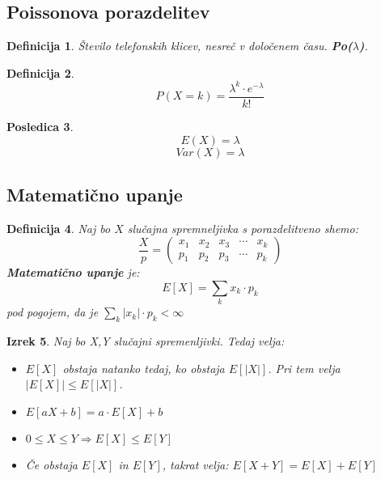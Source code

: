 \documentclass[11pt]{article}
\newtheorem{Izrek}{{\sc Izrek}}[section]
\newtheorem{Posledica}[Izrek]{{\sc Posledica}}
\newtheorem{Definicija}[Izrek]{{\sc Definicija}}
\begin{document}
\subsection{Poissonova porazdelitev}
\begin{Definicija}
	Število telefonskih klicev, nesreč v določenem času. \textbf{Po($\lambda$)}.
\end{Definicija}
\begin{Definicija}
	$$P(X=k) = \frac{\lambda^k \cdot e^{-\lambda}}{k!}$$
\end{Definicija}
\begin{Posledica}
	$$E(X) = \lambda$$
	$$Var(X) = \lambda$$
\end{Posledica}
\subsection{Matematično upanje}
\begin{Definicija}
	Naj bo $X$ slučajna spremneljivka s porazdelitveno shemo:
		\[
		\frac{X}{p} = \begin{pmatrix}
		x_1 & x_2 & x_3 & \cdots & x_k \\       p_1 & p_2 & p_3 & \cdots & p_k
		\end{pmatrix}
		\]
	\textbf{Matematično upanje} je:
	$$ E[X] = \sum_{k}{x_k \cdot p_k}$$
	pod pogojem, da je $\sum_{k}{|x_k|\cdot p_k} < \infty$
\end{Definicija}
\begin{Izrek}
	Naj bo X,Y slučajni spremenljivki. Tedaj velja:
	\begin{itemize}
		\item
		 $ E[X]$ obstaja natanko tedaj, ko obstaja $ E[|X|]$. Pri tem velja $|E[X]| \le E[|X|]$.
		 \item
		 $ E[aX+b] = a \cdot  E[X] + b$
		 \item
		 $0 \le X \le Y \Rightarrow  E[X] \le  E[Y]$
		 \item
		 Če obstaja $ E[X]$ in $ E[Y]$, takrat velja: $ E[X+Y] =  E[X] +  E[Y]$ 
	\end{itemize}
\end{Izrek}
\end{document}
